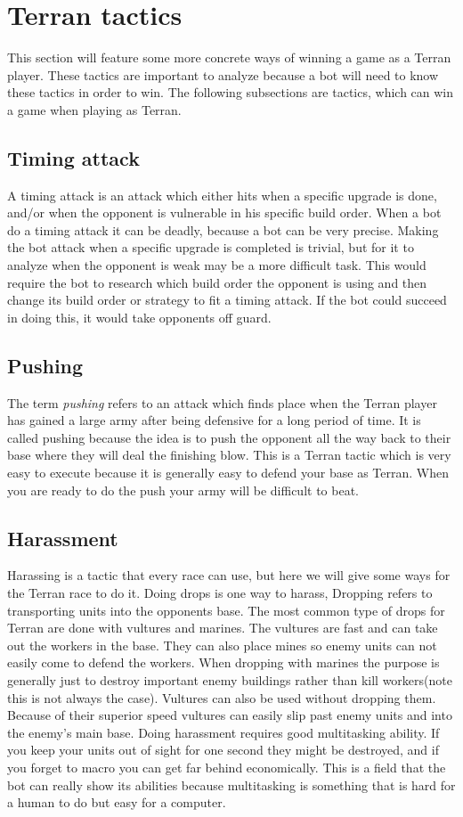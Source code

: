 \section{Terran tactics}
	This section will feature some more concrete ways of winning a game as a Terran player. 
	These tactics are important to analyze because a bot will need to know these tactics in order to win.
	The following subsections are tactics, which can win a game when playing as Terran.
	
	\subsection{Timing attack}
		A timing attack is an attack which either hits when a specific upgrade is done, and/or when the opponent is vulnerable in his specific build order. 
		When a bot do a timing attack it can be deadly, because a bot can be very precise. Making the bot attack when a specific upgrade is completed is trivial, but for it to 
		analyze when the opponent is weak may be a more difficult task. This would require the bot to research which build order the opponent is using and 
		then change its build order or strategy to fit a timing attack. If the bot could succeed in doing this, it would take opponents off guard.
		
	\subsection{Pushing}
		The term \textit{pushing} refers to an attack which finds place when the Terran player has gained a large army after being defensive for a long 
		period of time. It is called pushing because the idea is to push the opponent 
		all the way back to their base where they will deal the finishing blow. This is a Terran tactic which is very easy to execute because it is generally
		easy to defend your base as Terran. When you are ready to do the push your army will be difficult to beat.
		
	\subsection{Harassment}
		Harassing is a tactic that every race can use, but here we will give some ways for the Terran race to do it. Doing drops is one way to harass, Dropping 
		refers to transporting units into the opponents base. The most common type of drops for Terran are done with vultures and marines. The vultures are 
		fast and can take out the workers in the base. They can also place mines so enemy units can not easily come to defend the workers. When dropping with marines 
		the purpose is generally just to destroy important enemy buildings rather than kill workers(note this is not always the case). Vultures can also be used without 
		dropping them. Because of their superior speed vultures can easily slip past enemy units and into the enemy's main base. Doing harassment requires 
		good multitasking ability. If you keep your units out of sight for one second they might be destroyed, and if you forget to macro you can 
		get far behind economically. This is a field that the bot can really show its abilities because multitasking is something that is hard for a human to do but 
		easy for a computer.
	
